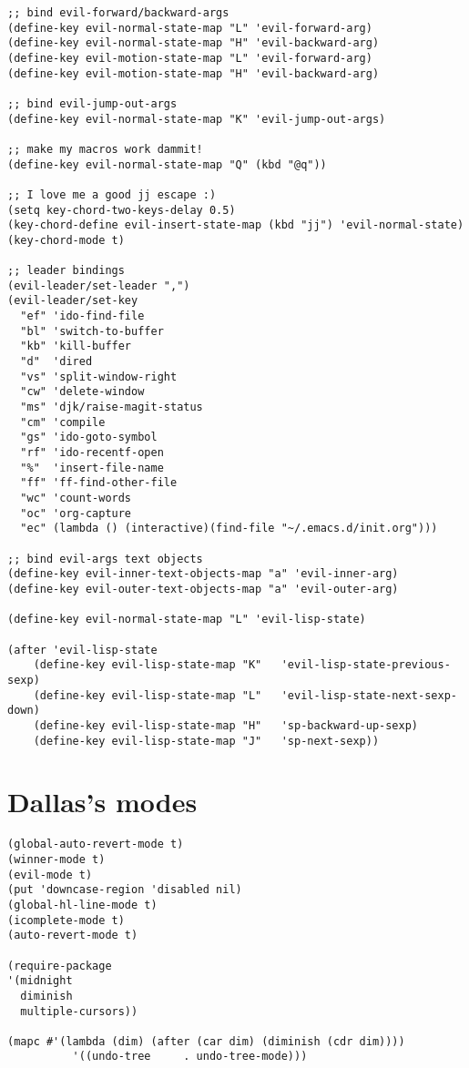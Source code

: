 \documentclass[11pt]{article}
\begin{document}
\begin{verbatim}
;; bind evil-forward/backward-args
(define-key evil-normal-state-map "L" 'evil-forward-arg)
(define-key evil-normal-state-map "H" 'evil-backward-arg)
(define-key evil-motion-state-map "L" 'evil-forward-arg)
(define-key evil-motion-state-map "H" 'evil-backward-arg)

;; bind evil-jump-out-args
(define-key evil-normal-state-map "K" 'evil-jump-out-args)

;; make my macros work dammit!
(define-key evil-normal-state-map "Q" (kbd "@q"))

;; I love me a good jj escape :)  
(setq key-chord-two-keys-delay 0.5)
(key-chord-define evil-insert-state-map (kbd "jj") 'evil-normal-state)
(key-chord-mode t)

;; leader bindings
(evil-leader/set-leader ",")
(evil-leader/set-key
  "ef" 'ido-find-file
  "bl" 'switch-to-buffer
  "kb" 'kill-buffer
  "d"  'dired
  "vs" 'split-window-right
  "cw" 'delete-window
  "ms" 'djk/raise-magit-status
  "cm" 'compile
  "gs" 'ido-goto-symbol
  "rf" 'ido-recentf-open
  "%"  'insert-file-name
  "ff" 'ff-find-other-file
  "wc" 'count-words
  "oc" 'org-capture
  "ec" (lambda () (interactive)(find-file "~/.emacs.d/init.org")))

;; bind evil-args text objects
(define-key evil-inner-text-objects-map "a" 'evil-inner-arg)
(define-key evil-outer-text-objects-map "a" 'evil-outer-arg)

(define-key evil-normal-state-map "L" 'evil-lisp-state)

(after 'evil-lisp-state 
    (define-key evil-lisp-state-map "K"   'evil-lisp-state-previous-sexp)
    (define-key evil-lisp-state-map "L"   'evil-lisp-state-next-sexp-down)
    (define-key evil-lisp-state-map "H"   'sp-backward-up-sexp)
    (define-key evil-lisp-state-map "J"   'sp-next-sexp))
\end{verbatim}
\section{Dallas's modes}
\label{sec-12}


\begin{verbatim}
(global-auto-revert-mode t)
(winner-mode t)
(evil-mode t)
(put 'downcase-region 'disabled nil)
(global-hl-line-mode t)
(icomplete-mode t)
(auto-revert-mode t)

(require-package 
'(midnight
  diminish 
  multiple-cursors)) 

(mapc #'(lambda (dim) (after (car dim) (diminish (cdr dim))))
          '((undo-tree     . undo-tree-mode)))
\end{verbatim}
\end{document}
